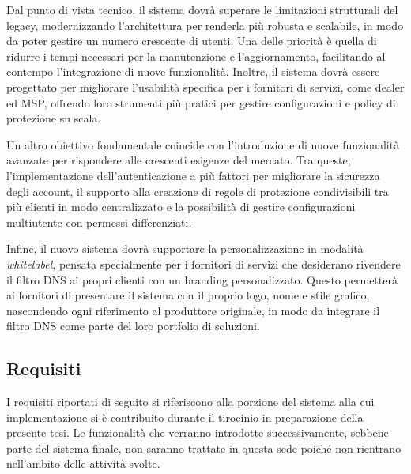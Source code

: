 Dal punto di vista tecnico, il sistema dovrà superare le limitazioni strutturali del legacy, modernizzando l'architettura per renderla più robusta e scalabile, in modo da poter gestire un numero crescente di utenti. Una delle priorità è quella di ridurre i tempi necessari per la manutenzione e l’aggiornamento, facilitando al contempo l’integrazione di nuove funzionalità. Inoltre, il sistema dovrà essere progettato per migliorare l’usabilità specifica per i fornitori di servizi, come dealer ed MSP, offrendo loro strumenti più pratici per gestire configurazioni e policy di protezione su scala.

Un altro obiettivo fondamentale coincide con l'introduzione di nuove funzionalità avanzate per rispondere alle crescenti esigenze del mercato. Tra queste, l’implementazione dell’autenticazione a più fattori per migliorare la sicurezza degli account, il supporto alla creazione di regole di protezione condivisibili tra più clienti in modo centralizzato e la possibilità di gestire configurazioni multiutente con permessi differenziati.

Infine, il nuovo sistema dovrà supportare la personalizzazione in modalità \emph{whitelabel}, pensata specialmente per i fornitori di servizi che desiderano rivendere il filtro DNS ai propri clienti con un branding personalizzato. Questo permetterà ai fornitori di presentare il sistema con il proprio logo, nome e stile grafico, nascondendo ogni riferimento al produttore originale, in modo da integrare il filtro DNS come parte del loro portfolio di soluzioni.

\subsection{Requisiti}
I requisiti riportati di seguito si riferiscono alla porzione del sistema alla cui implementazione si è contribuito durante il tirocinio in preparazione della presente tesi. Le funzionalità che verranno introdotte successivamente, sebbene parte del sistema finale, non saranno trattate in questa sede poiché non rientrano nell’ambito delle attività svolte.

